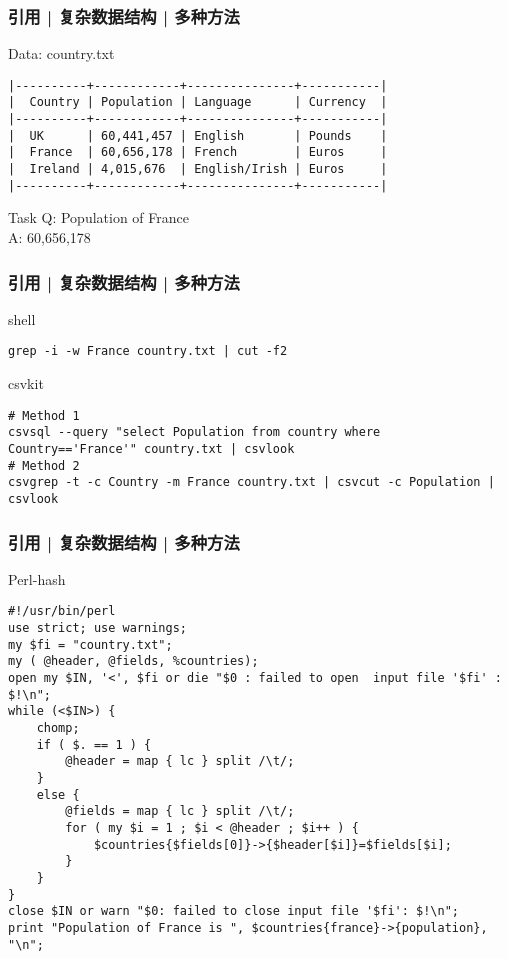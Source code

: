 \begin{frame}[fragile]
  \frametitle{引用 | 复杂数据结构 | 多种方法}
  \begin{block}{Data: country.txt}
\begin{lstlisting}[basicstyle=\footnotesize\tt,numberstyle=\scriptsize]
|----------+------------+---------------+-----------|
|  Country | Population | Language      | Currency  |
|----------+------------+---------------+-----------|
|  UK      | 60,441,457 | English       | Pounds    |
|  France  | 60,656,178 | French        | Euros     |
|  Ireland | 4,015,676  | English/Irish | Euros     |
|----------+------------+---------------+-----------|
\end{lstlisting}
  \end{block}
  \pause
  \begin{block}{Task}
    Q: Population of France\\
    A: 60,656,178
  \end{block}
\end{frame}

\begin{frame}[fragile]
  \frametitle{引用 | 复杂数据结构 | 多种方法}
  \begin{block}{shell}
\begin{lstlisting}
grep -i -w France country.txt | cut -f2
\end{lstlisting}
  \end{block}
  \pause
  \begin{block}{csvkit}
\begin{lstlisting}
# Method 1
csvsql --query "select Population from country where Country=='France'" country.txt | csvlook
# Method 2
csvgrep -t -c Country -m France country.txt | csvcut -c Population | csvlook
\end{lstlisting}
  \end{block}
\end{frame}

\begin{frame}[fragile]
  \frametitle{引用 | 复杂数据结构 | 多种方法}
  \begin{block}{Perl-hash}
\begin{lstlisting}[basicstyle=\scriptsize\tt,numberstyle=\scriptsize]
#!/usr/bin/perl
use strict; use warnings;
my $fi = "country.txt";
my ( @header, @fields, %countries);
open my $IN, '<', $fi or die "$0 : failed to open  input file '$fi' : $!\n";
while (<$IN>) {
    chomp;
    if ( $. == 1 ) {
        @header = map { lc } split /\t/;
    }
    else {
        @fields = map { lc } split /\t/;
        for ( my $i = 1 ; $i < @header ; $i++ ) {
            $countries{$fields[0]}->{$header[$i]}=$fields[$i];
        }
    }
}
close $IN or warn "$0: failed to close input file '$fi': $!\n";
print "Population of France is ", $countries{france}->{population}, "\n";
\end{lstlisting}
  \end{block}
\end{frame}

